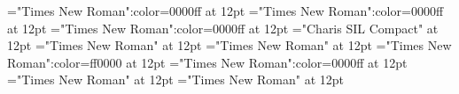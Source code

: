 \documentclass{article}
\begin{document}
 
\thispagestyle{empty} 
\font\examplesensearticlesectionletter="Times New Roman":color=0000ff at 12pt
\font\exampleusefirstoftypelastoftypesensearticlesectionletter="Times New Roman":color=0000ff at 12pt
\font\firstoftypegrammarcategorylastoftypesensearticlesectionletter="Times New Roman":color=0000ff at 12pt
\font\firstoftypelastoftypestressfirstoftypelastoftypepronunciationarticlesectionletter="Charis SIL Compact" at 12pt
\font\firstoftypelastoftypepronunciationarticlesectionletter="Times New Roman" at 12pt
\font\firstoftypeheadwordlastoftypesectionletter="Times New Roman" at 12pt
\font\sensebeforearticlesectionletter="Times New Roman":color=ff0000 at 12pt
\font\sensearticlesectionletter="Times New Roman":color=0000ff at 12pt
\font\articlesectionletter="Times New Roman" at 12pt
\font\sectionletter="Times New Roman" at 12pt

\end{document}
